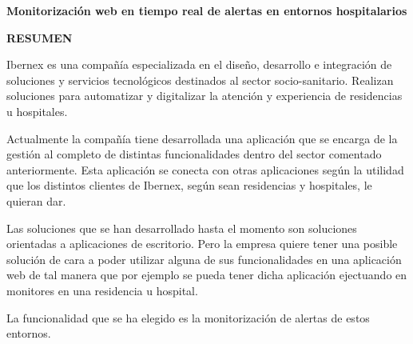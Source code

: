 \begin{center}
{\Large \bfseries Monitorización web en tiempo real de alertas en entornos hospitalarios}

\vspace{1cm}
{\Large \bfseries RESUMEN}

\end{center}


Ibernex es una compañía especializada en el diseño, desarrollo e integración de soluciones y servicios tecnológicos destinados al sector socio-sanitario.
Realizan soluciones para automatizar y digitalizar la atención y experiencia de residencias u hospitales. \newline

Actualmente la compañía tiene desarrollada una aplicación que se encarga de la gestión al completo de distintas funcionalidades dentro del sector comentado anteriormente. Esta aplicación se conecta con otras aplicaciones según la utilidad que los distintos clientes de Ibernex, según sean residencias y hospitales, le quieran dar.\newline

Las soluciones que se han desarrollado hasta el momento son soluciones orientadas a aplicaciones de escritorio. Pero la empresa quiere tener una posible solución de cara a poder utilizar alguna de sus funcionalidades en una aplicación web de tal manera que por ejemplo se pueda tener dicha aplicación ejectuando en monitores en una residencia u hospital. \newline

La funcionalidad que se ha elegido es la monitorización de alertas de estos entornos.

